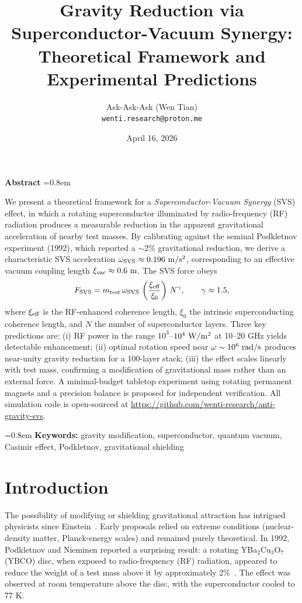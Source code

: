 \documentclass[12pt,a4paper]{article}
\title{\textbf{Gravity Reduction via Superconductor-Vacuum Synergy:\\ Theoretical Framework and Experimental Predictions}}
\author{Ask-Ask-Ask (Wen Tian)\\ \texttt{wenti.research@proton.me}}
\date{April 16, 2026}
\begin{document}
\maketitle
\thispagestyle{empty}
\vspace{-0.5cm}
\noindent\textbf{Abstract}
\parskip=0.8em

We present a theoretical framework for a \emph{Superconductor-Vacuum Synergy} (SVS) effect, in which a rotating superconductor illuminated by radio-frequency (RF) radiation produces a measurable reduction in the apparent gravitational acceleration of nearby test masses. By calibrating against the seminal Podkletnov experiment (1992), which reported a $\sim$2\% gravitational reduction, we derive a characteristic SVS acceleration $\omega_{\rm SVS}\approx 0.196\ {\rm m/s^2}$, corresponding to an effective vacuum coupling length $\xi_{\rm vac}\approx 0.6\ {\rm m}$. The SVS force obeys
\begin{equation}
F_{\rm SVS}=m_{\rm test}\,\omega_{\rm SVS}\,
\left(\frac{\xi_{\rm eff}}{\xi_0}\right)\,N^\gamma,
\qquad \gamma\approx 1.5,
\end{equation}
where $\xi_{\rm eff}$ is the RF-enhanced coherence length, $\xi_0$ the intrinsic superconducting coherence length, and $N$ the number of superconductor layers. Three key predictions are: (i) RF power in the range $10^3$--$10^4\ {\rm W/m^2}$ at 10--20 GHz yields detectable enhancement; (ii) optimal rotation speed near $\omega\sim 10^6\ {\rm rad/s}$ produces near-unity gravity reduction for a 100-layer stack; (iii) the effect scales linearly with test mass, confirming a modification of gravitational mass rather than an external force. A minimal-budget tabletop experiment using rotating permanent magnets and a precision balance is proposed for independent verification. All simulation code is open-sourced at \url{https://github.com/wenti-research/anti-gravity-svs}.

\parskip=0.8em
\noindent\textbf{Keywords:} gravity modification, superconductor, quantum vacuum, Casimir effect, Podkletnov, gravitational shielding

\newpage
\section{Introduction}

The possibility of modifying or shielding gravitational attraction has intrigued physicists since Einstein~\cite{einstein1916}. Early proposals relied on extreme conditions (nuclear-density matter, Planck-energy scales) and remained purely theoretical. In 1992, Podkletnov and Nieminen reported a surprising result: a rotating YBa$_2$Cu$_3$O$_7$ (YBCO) disc, when exposed to radio-frequency (RF) radiation, appeared to reduce the weight of a test mass above it by approximately 2\%~\cite{podkletnov1992}. The effect was observed at room temperature above the disc, with the superconductor cooled to 77 K.
\end{document}
